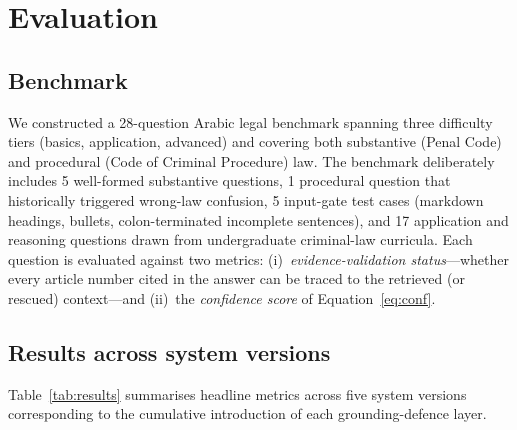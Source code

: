\documentclass[final,1p,times]{elsarticle}
\begin{document}
\section{Evaluation}\label{sec:eval}

\subsection{Benchmark}\label{sec:baseline}

We constructed a 28-question Arabic legal benchmark spanning three difficulty
tiers (basics, application, advanced) and covering both substantive (Penal
Code) and procedural (Code of Criminal Procedure) law. The benchmark
deliberately includes 5 well-formed substantive questions, 1 procedural
question that historically triggered wrong-law confusion, 5 input-gate test
cases (markdown headings, bullets, colon-terminated incomplete sentences),
and 17 application and reasoning questions drawn from undergraduate
criminal-law curricula. Each question is evaluated against two metrics:
(i)~\emph{evidence-validation status}---whether every article number cited in
the answer can be traced to the retrieved (or rescued) context---and
(ii)~the \emph{confidence score} of Equation~\ref{eq:conf}.

\subsection{Results across system versions}

Table~\ref{tab:results} summarises headline metrics across five system
versions corresponding to the cumulative introduction of each
grounding-defence layer.
\end{document}
